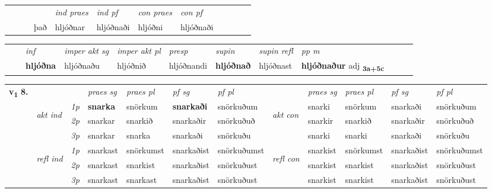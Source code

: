 \begin{tabular}{llllllllllll}
 & &  & &  \textit{ind praes} & \textit{ind pf} & \textit{con praes} & \textit{con pf} \\*
&  & & það & hljóðnar & hljóðnaði & hljóðni & hljóðnaði \\*
\cmidrule{5-9}
\end{tabular}


\begin{tabular}{llllllllllll}
 & & \textit{inf} & \textit{imper akt sg} & \textit{imper akt pl}   & \textit{presp} & \textit{supin} & \textit{supin refl} & \textit{pp m}     \\*
  & & \textbf{hljóðna} & hljóðnaðu  & hljóðnið   & hljóðnandi &  \textbf{hljóðnað} & hljóðnast & \textbf{hljóðnaður} adj \textbf{\textsubscript{3a+5c}} \\*
\cmidrule{1-12}
\end{tabular}



\begin{tabular}{llllllllllll} \toprule
\multirow{4}{*}{{{\textbf{v{\textsubscript{1}}} \Large{\textbf{8.}}}}}  & &   &  \textit{praes sg}  & \textit{praes pl}  &\textit{ pf sg} & \textit{pf pl} &  &  \textit{praes sg}  & \textit{praes pl}  & \textit{pf sg} & \textit{pf pl } \\*
	\cmidrule{4-7} \cmidrule{9-12}
 & \multirow{3}{*}{\begin{turn}{90}\textit{akt ind}\end{turn}} & {\textit{1p}} & \textbf{snarka} & snörkum    & \textbf{snarkaði} & snörkuðum & \multirow{3}{*}{\begin{turn}{90}\textit{akt con}\end{turn}} &snarki & snörkum & snarkaði & snörkuðum\\*
& &  {\textit{2p}} &  snarkar  & snarkið   & snarkaðir & snörkuðuð & & snarkir & snarkið & snarkaðir & snörkuðuð \\*
& &  {\textit{3p}} & snarkar & snarka   & snarkaði & snörkuðu & & snarki & snarki& snarkaði & snörkuðu  \\*
\cmidrule{4-7} \cmidrule{9-12}
 &\multirow{3}{*}{\begin{turn}{90}\textit{refl ind}\end{turn}} & {\textit{1p}} & snarkast & snörkumst    & snarkaðist & snörkuðumst & \multirow{3}{*}{\begin{turn}{90}\textit{refl con}\end{turn}}  &snarkist & snörkumst & snarkaðist & snörkuðumst\\*
 &&  {\textit{2p}} &  snarkast  & snarkist   & snarkaðist & snörkuðust & &snarkist & snarkist & snarkaðist & snörkuðust \\*
& &  {\textit{3p}} & snarkast & snarkast   & snarkaðist & snörkuðust & & snarkist & snarkist& snarkaðist & snörkuðust  \\*
\cmidrule{4-7} \cmidrule{9-12}
\end{tabular}


